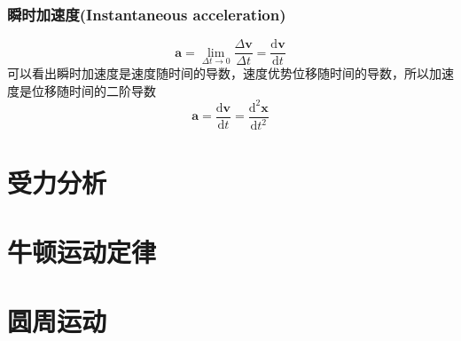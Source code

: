 \documentclass[a4paper,oneside,12pt]{article}
\newcommand{\bol}[1]{\textbf{#1}}
\newcommand{\diff}{\mathrm{d}}
\begin{document}
\subsubsection{瞬时加速度(Instantaneous acceleration)}
\begin{displaymath}
	\bol{a} = \lim_{\Delta t \to 0} \frac{\Delta \bol{v}}{\Delta t} = \frac{\diff \bol{v}}{\diff t}
\end{displaymath}
可以看出瞬时加速度是速度随时间的导数，速度优势位移随时间的导数，所以加速度是位移随时间的二阶导数
\begin{displaymath}
	\bol{a} = \frac{\diff \bol{v}}{\diff t} = \frac{\diff^2 \bol{x}}{\diff t^2}
\end{displaymath}
\section{受力分析}
\section{牛顿运动定律}
\section{圆周运动}
\end{document}
